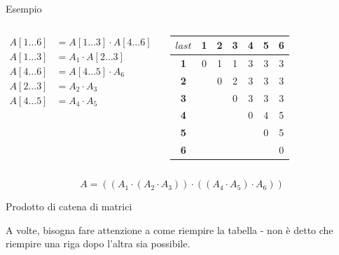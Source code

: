 \begin{frame}{Esempio}

\vspace{-6pt}
\begin{columns}[T]
\begin{align*}
A[1 \ldots 6] &= A[1 \ldots 3] \cdot A[4 \ldots 6] \\
A[1 \ldots 3] &= A_1 \cdot A[2 \ldots 3]\\
A[4 \ldots 6] &= A[4 \ldots 5] \cdot A_6\\
A[2 \ldots 3] &= A_2 \cdot A_3 \\
A[4 \ldots 5] &= A_4 \cdot A_5
\end{align*}

\begin{tabular}{|c|c|c|c|c|c|c|}
\hline
$\mathit{last}$ &  \textbf{1} & \textbf{2} & \textbf{3} & \textbf{4} & \textbf{5} & \textbf{6} \\\hline
\textbf{1} & 0 & 1 & 1 & 3 & 3 & 3 \\\hline
\textbf{2} &   & 0 & 2 & 3 & 3 & 3 \\\hline
\textbf{3} &   &   & 0 & 3 & 3 & 3 \\\hline
\textbf{4} &   &   &   & 0 & 4 & 5 \\\hline
\textbf{5} &   &   &   &   & 0 & 5 \\\hline
\textbf{6} &   &   &   &   &   & 0 \\\hline
\end{tabular}
\end{columns}

\begin{myboxtitle}
\[
 A = ( ( A_1 \cdot  (A_2 \cdot A_3) ) \cdot ( (A_4 \cdot A_5 )  \cdot A_6) )
\]
\end{myboxtitle}

\end{frame}

\begin{frame}{Prodotto di catena di matrici}

\vspace{-6pt}
\begin{myboxtitle}
A volte, bisogna fare attenzione a come riempire la tabella - non è detto che 
riempire una riga dopo l'altra sia possibile.
\end{myboxtitle}

\end{frame}

